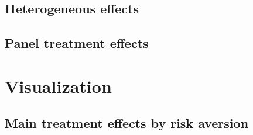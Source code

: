 \documentclass[10pt]{article}
\begin{document}
        
        
        
        
        
        
        

    \clearpage

	\subsection{Heterogeneous effects}

		
		
		
		
		
		
		
		
		
		
		
		
		
		
		
		
		
		
		
		
		

	\clearpage

	\subsection{Panel treatment effects}

		
		

	\clearpage

\section{Visualization}

	\subsection{Main treatment effects by risk aversion}
\end{document}
